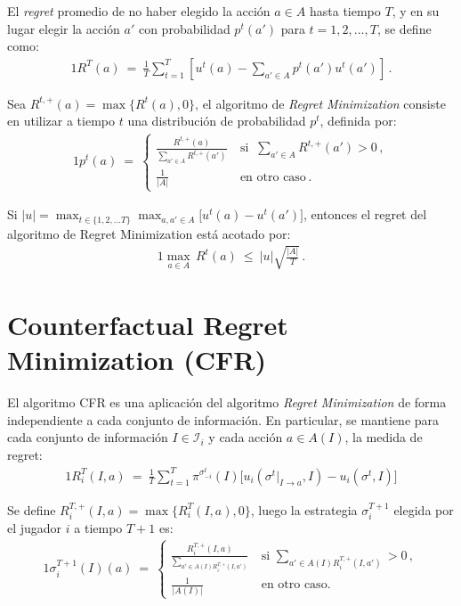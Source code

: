 \begin{definition}
\label{def:regret}
El \textit{regret} promedio de no haber elegido la acción $a \in A$ hasta tiempo $T$, y en su lugar elegir la acción $a'$ con probabilidad $p^t(a')$ para $t=1,2,\ldots,T$, se define como:
\begin{alignat}{1}
R^T(a)\ =\ \frac{1}{T} \sum_{t = 1}^T \left[u^t(a) - \sum_{a' \in A}p^t(a')u^t(a')\right] \,.
\end{alignat}
\end{definition}

Sea $R^{t, +}(a) = \max\{R^t(a), 0\}$, el algoritmo de \textit{Regret Minimization} consiste en utilizar a tiempo $t$ una distribución de probabilidad $p^t$, definida por:
\begin{alignat}{1}
p^t(a)\ =\ 
\begin{cases}
\frac{R^{t, +}(a)}{\sum_{a' \in A} R^{t, +}(a')}\ & \text{si }\ \sum_{a' \in A} R^{t, +}(a') > 0 \,, \\
\frac{1}{|A|}\ & \text{en otro caso} \,.
\end{cases}
\end{alignat}

\begin{theorem}
Si $|u| = \max_{t \in \{1, 2, ... T\}} \max_{a, a' \in A}\bigl[u^t(a) - u^t(a')\bigr]$, entonces el regret del algoritmo de Regret Minimization está acotado por:
\begin{alignat}{1}
\max_{a \in A}\,R^t(a)\ \leq\ |u| \sqrt{\frac{|A|}{T}} \,.
\end{alignat}
\end{theorem}

\section{Counterfactual Regret Minimization (CFR)}
\label{section:cfr}

El algoritmo CFR es una aplicación del algoritmo \textit{Regret Minimization} de forma independiente a cada conjunto de información. En particular, se mantiene para cada conjunto de información $I \in \mathcal{I}_i$ y cada acción $a \in A(I)$, la medida de regret:
\begin{alignat}{1}
R_i^T(I, a)\ =\ \frac{1}{T} \sum_{t = 1}^T \pi^{\sigma^t_{-i}}(I)\biggl[u_i(\sigma^t|_{I \rightarrow a}, I) - u_i(\sigma^t, I)\biggr]
\end{alignat}

Se define $R_i^{T, +}(I, a) = \max\{R_i^T(I, a), 0\}$, luego la estrategia $\sigma^{T+1}_i$ elegida por el jugador $i$ a tiempo $T+1$ es:
\begin{alignat}{1}
\label{eq:cfr-regret-matching}
\sigma_i^{T+1}(I)(a)\ =\
\begin{cases}
\frac{R_i^{T, +}(I, a)}{\sum_{a' \in A(I) R_i^{T, +}(I, a')}}\ & \text{si } \sum_{a' \in A(I) R_i^{T, +}(I, a')} > 0 \,, \\
\frac{1}{|A(I)|}\ & \text{en otro caso.} 
\end{cases}
\end{alignat}


